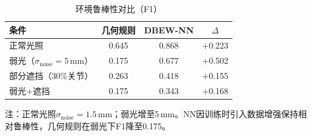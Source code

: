 \begin{table}[htbp]
  \centering
  \caption{环境鲁棒性对比（F1）}
  \label{tab:gesture_robustness}
  \small
  \setlength{\tabcolsep}{14pt}
  \begin{tabular}{lccc}
  \hline
  条件 & 几何规则 & DBEW-NN & $\Delta$ \\
  \hline
  正常光照 & 0.645 & 0.868 & $+$0.223 \\
  弱光（$\sigma_\mathrm{noise}{=}5$\,mm） & 0.175 & 0.677 & $+$0.502 \\
  部分遮挡（30\%关节） & 0.263 & 0.418 & $+$0.155 \\
  弱光$+$遮挡 & 0.175 & 0.343 & $+$0.168 \\
  \hline
  \end{tabular}
  \noindent\begin{minipage}{\linewidth}\footnotesize
  注：正常光照$\sigma_\mathrm{noise}{=}1.5$\,mm；弱光增至5\,mm。NN因训练时引入数据增强保持相对鲁棒性，几何规则在弱光下F1降至0.175。
  \end{minipage}
\end{table}
